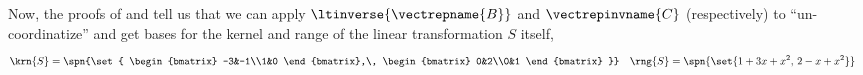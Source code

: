 %
Now, the proofs of  and  tell us that we can apply $\ltinverse{\vectrepname{B}}$ and $\vectrepinvname{C}$ (respectively) to ``un-coordinatize'' and get bases for the kernel and range of the linear transformation $S$ itself,
%
\begin{align*}
\krn{S}&=\spn{\set{
\begin{bmatrix}
-3&-1\\1&0
\end{bmatrix},\,
\begin{bmatrix}
0&2\\0&1
\end{bmatrix}
}}
&
\rng{S}&=\spn{\set{1+3x+x^2,\,2-x+x^2}}
\end{align*}
%